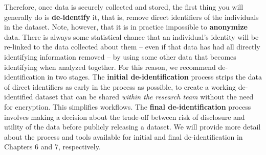 Therefore, once data is securely collected and stored,
the first thing you will generally do is \textbf{de-identify} it,
that is, remove direct identifiers of the individuals in the dataset.
Note, however, that it is in practice impossible to \textbf{anonymize} data.
There is always some statistical chance that an individual's identity
will be re-linked to the data collected about them
-- even if that data has had all directly identifying information removed --
by using some other data that becomes identifying when analyzed together.
For this reason, we recommend de-identification in two stages.
The \textbf{initial de-identification} process strips the data of direct identifiers 
as early in the process as possible,
to create a working de-identified dataset that
can be shared \textit{within the research team} without the need for encryption.
This simplifies workflows. 
The \textbf{final de-identification} process involves
making a decision about the trade-off between
risk of disclosure and utility of the data
before publicly releasing a dataset.
We will provide more detail about the process and tools available
for initial and final de-identification in Chapters 6 and 7, respectively.
